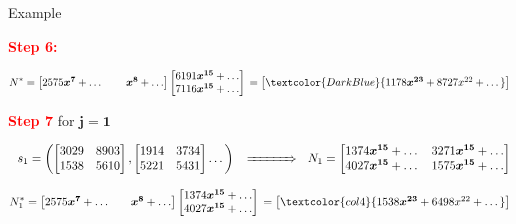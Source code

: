\documentclass[final]{beamer}
\newlength{\twocolwid}
\begin{document}
\begin{frame}[t]
\begin{columns}[t]
\begin{column}{\twocolwid}
\begin{alertblock}{{\sf Example}}
\vspace{3mm}

		\textcolor{red}{\bf Step 6:}

\vspace{-2em}

		$$  N^* = \begin{bmatrix}
		2575\boldsymbol{x^7}+\dots ~~&~~ \boldsymbol{x^8} + \dots
		\end{bmatrix}
                \begin{bmatrix}
		6191\boldsymbol{x^{15}} + \dots\\
		7116\boldsymbol{x^{15}} + \dots
		\end{bmatrix}\,
=                \begin{bmatrix}
 \textcolor{DarkBlue}{1178\boldsymbol{x^{23}} + 8727x^{22} + \dots}
\end{bmatrix}$$

\vspace{3mm}

\textcolor{red}{\bf Step 7} {\sf for} $\boldsymbol{j = 1}$

\vspace{-0.5em}

	$$ ~~s_1 = \left(
		\begin{bmatrix}
		3029& 8903\\
		1538& 5610
		\end{bmatrix},
		\begin{bmatrix}
		1914&3734\\
		5221&5431
		\end{bmatrix}
		\dots
		\right)\,
                ~~\xRightarrow{~~~~~~~~~~}~~
		N_1 = \begin{bmatrix}
		  1374\boldsymbol{x^{15}} + \dots & 3271\boldsymbol{x^{15}} + \dots\\
		4027\boldsymbol{x^{15}} + \dots & 1575\boldsymbol{x^{15}} + \dots
		\end{bmatrix}
		$$

		$$  N_1^* = \begin{bmatrix}
		2575\boldsymbol{x^7}+\dots ~~&~ \boldsymbol{x^8} + \dots
		\end{bmatrix}
                \begin{bmatrix}
		1374\boldsymbol{x^{15}} + \dots\\
		4027\boldsymbol{x^{15}} + \dots
		\end{bmatrix}\,
=                \begin{bmatrix}
\textcolor{col4}{ 1538\boldsymbol{x^{23}} + 6498x^{22} + \dots}
\end{bmatrix}
		$$


\end{alertblock}
\end{column}
\end{columns}
\end{frame}
\end{document}
